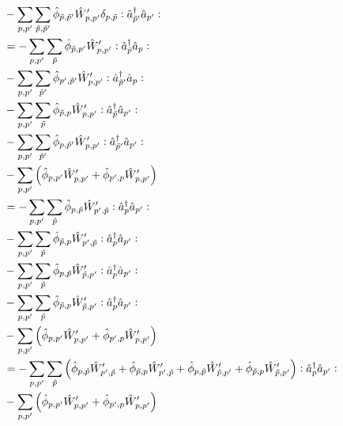 \begin{appendix}
\begin{itemize}
\begin{align}
&-\Sum_{p, p^\prime}\Sum_{\tilde p,\tilde p^\prime} \hat\phi_{\tilde p,\tilde p^\prime}\hat W_{p,p^\prime}^\prime \delta_{p,\tilde p}\NO\CR_{\tilde p^\prime}\AN_{p^\prime}\NO \nonumber\\
&=-\Sum_{p, p^\prime}\Sum_{\tilde p} \hat\phi_{\tilde p,p^\prime}\hat W_{p,p^\prime}^\prime \NO\CR_{\tilde p}\AN_p\NO \\
&-\Sum_{p, p^\prime}\Sum_{\tilde p^\prime} \hat\phi_{p^\prime,\tilde p^\prime}\hat W_{p,p^\prime}^\prime\NO\CR_{\tilde p^\prime}\AN_p\NO \nonumber\\
&-\Sum_{p, p^\prime}\Sum_{\tilde p} \hat\phi_{\tilde p,p}\hat W_{p,p^\prime}^\prime \NO\CR_{\tilde p}\AN_{p^\prime}\NO \nonumber\\
&-\Sum_{p, p^\prime}\Sum_{\tilde p^\prime} \hat\phi_{p,\tilde p^\prime}\hat W_{p,p^\prime}^\prime\NO\CR_{\tilde p^\prime}\AN_{p^\prime}\NO \nonumber\\
&-\Sum_{p, p^\prime}\left( \hat\phi_{ p, p^\prime}\hat W_{p,p^\prime}^\prime+ \hat\phi_{p^\prime,p}\hat W_{p,p^\prime}^\prime\right)\nonumber\\
&=-\Sum_{p, p^\prime}\Sum_{\tilde p} \hat\phi_{p,\tilde p}\hat W_{p^\prime,\tilde p}^\prime \NO\CR_{p}\AN_{p^\prime}\NO \\
&-\Sum_{p, p^\prime}\Sum_{\tilde p} \hat\phi_{\tilde p,p}\hat W_{p^\prime,\tilde p}^\prime\NO\CR_{p}\AN_{p^\prime}\NO \nonumber\\
&-\Sum_{p, p^\prime}\Sum_{\tilde p} \hat\phi_{p,\tilde p}\hat W_{\tilde p,p^\prime}^\prime \NO\CR_{p}\AN_{p^\prime}\NO \nonumber\\
&-\Sum_{p, p^\prime}\Sum_{\tilde p} \hat\phi_{\tilde p,p}\hat W_{\tilde p,p^\prime}^\prime\NO\CR_{p}\AN_{p^\prime}\NO \nonumber\\
&-\Sum_{p, p^\prime}\left( \hat\phi_{ p, p^\prime}\hat W_{p,p^\prime}^\prime+ \hat\phi_{p^\prime,p}\hat W_{p,p^\prime}^\prime\right)\nonumber\\
&=-\Sum_{p, p^\prime}\Sum_{\tilde p} \left(\hat\phi_{p,\tilde p}\hat W_{p^\prime,\tilde p}^\prime+\hat\phi_{\tilde p,p}\hat W_{p^\prime,\tilde p}^\prime+\hat\phi_{p,\tilde p}\hat W_{\tilde p,p^\prime}^\prime  + \hat\phi_{\tilde p,p}\hat W_{\tilde p,p^\prime}^\prime\right)\NO\CR_{p}\AN_{p^\prime}\NO \\
&-\Sum_{p, p^\prime}\left( \hat\phi_{ p, p^\prime}\hat W_{p,p^\prime}^\prime+ \hat\phi_{p^\prime,p}\hat W_{p,p^\prime}^\prime\right)\nonumber

\end{align}
\end{itemize}
\end{appendix}
